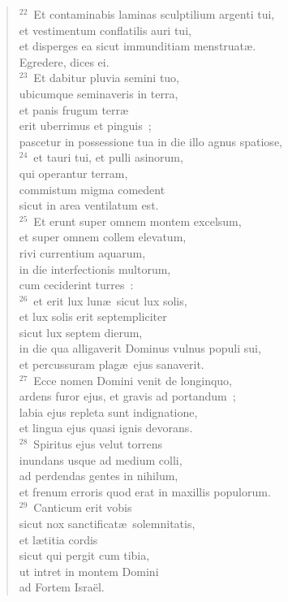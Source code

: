 \begin{flushleft}
\begin{verse}
${}^{22}$~Et contaminabis laminas sculptilium argenti tui,\\ et vestimentum conflatilis auri tui,\\ et disperges ea sicut immunditiam menstruat\ae .\\ Egredere, dices ei.\\
${}^{23}$~Et dabitur pluvia semini tuo,\\ ubicumque seminaveris in terra,\\ et panis frugum terr\ae \\ erit uberrimus et pinguis~;\\ pascetur in possessione tua in die illo agnus spatiose,\\
${}^{24}$~et tauri tui, et pulli asinorum,\\ qui operantur terram,\\ commistum migma comedent\\ sicut in area ventilatum est.\\
${}^{25}$~Et erunt super omnem montem excelsum,\\ et super omnem collem elevatum,\\ rivi currentium aquarum,\\ in die interfectionis multorum,\\ cum ceciderint turres~:\\
${}^{26}$~et erit lux lun\ae\ sicut lux solis,\\ et lux solis erit septempliciter\\ sicut lux septem dierum,\\ in die qua alligaverit Dominus vulnus populi sui,\\ et percussuram plag\ae\ ejus sanaverit.\\
${}^{27}$~Ecce nomen Domini venit de longinquo,\\ ardens furor ejus, et gravis ad portandum~;\\ labia ejus repleta sunt indignatione,\\ et lingua ejus quasi ignis devorans.\\
${}^{28}$~Spiritus ejus velut torrens\\ inundans usque ad medium colli,\\ ad perdendas gentes in nihilum,\\ et frenum erroris quod erat in maxillis populorum.\\
${}^{29}$~Canticum erit vobis\\ sicut nox sanctificat\ae\ solemnitatis,\\ et l\ae titia cordis\\ sicut qui pergit cum tibia,\\ ut intret in montem Domini\\ ad Fortem Isra\"el.\\

\end{verse}
\end{flushleft}
